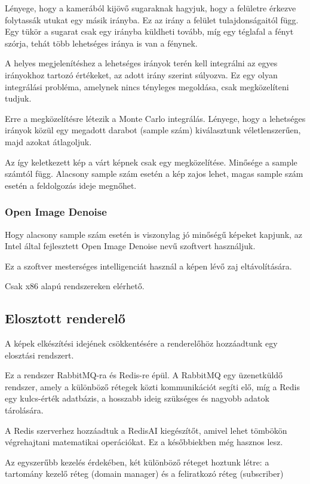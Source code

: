 Lényege, hogy a kamerából kijövő sugaraknak hagyjuk, hogy a felületre érkezve folytassák utukat egy másik irányba. Ez az irány a felület tulajdonságaitól függ. Egy tükör a sugarat csak egy irányba küldheti tovább, míg egy téglafal a fényt szórja, tehát több lehetséges iránya is van a fénynek. 

A helyes megjelenítéshez a lehetséges irányok terén kell integrálni az egyes irányokhoz tartozó értékeket, az adott irány szerint súlyozva. Ez egy olyan integrálási probléma, amelynek nincs tényleges megoldása, csak megközelíteni tudjuk.

Erre a megközelítésre létezik a Monte Carlo integrálás. Lényege, hogy a lehetséges irányok közül egy megadott darabot (sample szám) kiválasztunk véletlenszerűen, majd azokat átlagoljuk.

Az így keletkezett kép a várt képnek csak egy megközelítése. Minősége a sample számtól függ. Alacsony sample szám esetén a kép zajos lehet, magas sample szám esetén a feldolgozás ideje megnőhet.

\subsubsection{Open Image Denoise}
Hogy alacsony sample szám esetén is viszonylag jó minőségű képeket kapjunk, az Intel által fejlesztett Open Image Denoise nevű szoftvert használjuk. 

Ez a szoftver mesterséges intelligenciát használ a képen lévő zaj eltávolítására.

Csak x86 alapú rendszereken elérhető.


\subsection{Elosztott renderelő}

A képek elkészítési idejének csökkentésére a renderelőhöz hozzáadtunk egy elosztási rendszert.

Ez a rendszer RabbitMQ-ra és Redis-re épül. A RabbitMQ egy üzenetküldő rendszer, amely a különböző rétegek közti kommunikációt segíti elő, míg a Redis egy kulcs-érték adatbázis, a hosszabb ideig szükséges és nagyobb adatok tárolására.

A Redis szerverhez hozzáadtuk a RedisAI kiegészítőt, amivel lehet tömbökön végrehajtani matematikai operációkat. Ez a későbbiekben még hasznos lesz.

Az egyszerűbb kezelés érdekében, két különböző réteget hoztunk létre: a tartomány kezelő réteg (domain manager) és a feliratkozó réteg (subscriber)

